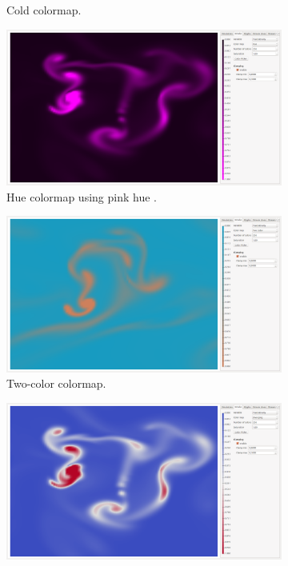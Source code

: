 \begin{figure}
\begin{subfigure}{0.44\textwidth}
		\caption{Cold colormap.}
		\label{fig:colormapping:intro:differntColorMaps:cold}
	\end{subfigure}
		\begin{subfigure}{0.44\textwidth}
		\centering
		\includegraphics[width=\textwidth, trim={35px 30px 430px 30px}, clip]{colormapping/img/hue}
		\caption{Hue colormap using pink hue .}
		\label{fig:colormapping:intro:differntColorMaps:hue}
	\end{subfigure}
	\begin{subfigure}{0.44\textwidth}
		\centering
		\includegraphics[width=\textwidth, trim={35px 30px 430px 30px}, clip]{colormapping/img/twocolors}
		\caption{Two-color colormap.}
		\label{fig:colormapping:intro:differntColorMaps:twocolor}
	\end{subfigure}	\begin{subfigure}{0.44\textwidth}
		\centering
		\includegraphics[width=\textwidth, trim={35px 30px 430px 30px}, clip]{colormapping/img/diverging}

\end{subfigure}
\end{figure}

